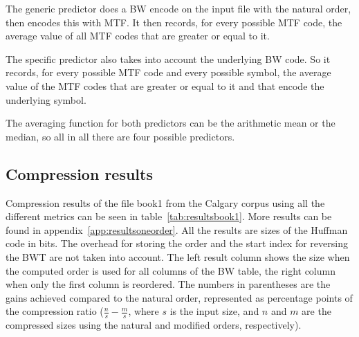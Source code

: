 \documentclass[a4paper]{scrreprt}
\begin{document}
The generic predictor does a BW encode on the input file with the natural order,
then encodes this with MTF. It then records, for every possible MTF code, the
average value of all MTF codes that are greater or equal to it.

The specific predictor also takes into account the underlying BW code. So it
records, for every possible MTF code and every possible symbol, the average
value of the MTF codes that are greater or equal to it and that encode the
underlying symbol.

The averaging function for both predictors can be the arithmetic mean or the
median, so all in all there are four possible predictors.

\subsection{Compression results}

Compression results of the file book1 from the Calgary corpus using all the
different metrics can be seen in table~\ref{tab:resultsbook1}. More results can
be found in appendix~\ref{app:resultsoneorder}.
All the results are sizes of the Huffman code in bits. The overhead for storing
the order and the start index for reversing the BWT are not taken into account.
The left result column shows the size when the computed order is used for all
columns of the BW table, the right column when only the first column is
reordered.
The numbers in parentheses are the gains achieved compared to the natural order,
represented as percentage points of the compression ratio (\(\frac{n}{s} -
\frac{m}{s}\), where \(s\) is the input size, and \(n\) and \(m\) are the
compressed sizes using the natural and modified orders, respectively).
\end{document}
